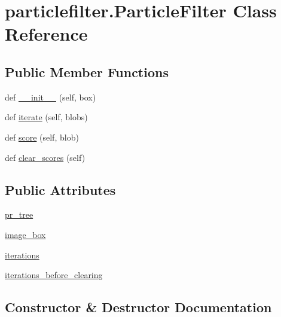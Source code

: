 \section{particlefilter.\+Particle\+Filter Class Reference}
\label{classparticlefilter_1_1ParticleFilter}
\subsection*{Public Member Functions}
\begin{DoxyCompactItemize}
\item 
def \hyperlink{classparticlefilter_1_1ParticleFilter_a6948f5fd9e23311a5d852d4cee9fcd74}{\+\_\+\+\_\+init\+\_\+\+\_\+} (self, box)
\item 
def \hyperlink{classparticlefilter_1_1ParticleFilter_a712cbf35d447e829bee6eb3511d6ed84}{iterate} (self, blobs)
\item 
def \hyperlink{classparticlefilter_1_1ParticleFilter_a14d4400ba16d6413f279baa8d0aaff2d}{score} (self, blob)
\item 
def \hyperlink{classparticlefilter_1_1ParticleFilter_a23de668d643dfd03ef021b18129be7ec}{clear\+\_\+scores} (self)
\end{DoxyCompactItemize}
\subsection*{Public Attributes}
\begin{DoxyCompactItemize}
\item 
\hyperlink{classparticlefilter_1_1ParticleFilter_ad105183603f7e2a9b31ad9b51a904876}{pr\+\_\+tree}
\item 
\hyperlink{classparticlefilter_1_1ParticleFilter_a057adc68ef8ba14478db6e8a453eca32}{image\+\_\+box}
\item 
\hyperlink{classparticlefilter_1_1ParticleFilter_a6bb442d25bc95fd1174e0f1f65a5b059}{iterations}
\item 
\hyperlink{classparticlefilter_1_1ParticleFilter_a3aee419fa01abd6a08a0b512a79d5123}{iterations\+\_\+before\+\_\+clearing}
\end{DoxyCompactItemize}


\subsection{Constructor \& Destructor Documentation}
